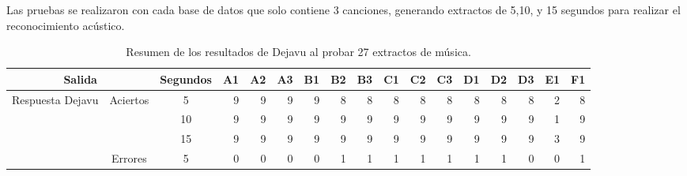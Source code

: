 \begin{sidewaystable}
\centering
\caption{Resumen de los resultados de Dejavu al probar 27 extractos de música.}{Las pruebas se realizaron con cada base de datos que solo contiene 3 canciones, generando extractos de 5,10, y 15 segundos para realizar el reconocimiento acústico.}
\label{tab:Resumen3Canciones}
\begin{tabular}{@{}ccc|rrrrrrrrrrrrrr@{}}
\toprule
\midrule
\multicolumn{2}{c}{Salida}                                            &  Segundos  & \multicolumn{1}{c}{A1} & \multicolumn{1}{c}{A2} & \multicolumn{1}{c}{A3} & \multicolumn{1}{c}{B1} & \multicolumn{1}{c}{B2} & \multicolumn{1}{c}{B3} & \multicolumn{1}{c}{C1} & \multicolumn{1}{c}{C2} & \multicolumn{1}{c}{C3} & \multicolumn{1}{c}{D1} & \multicolumn{1}{c}{D2} & \multicolumn{1}{c}{D3} & \multicolumn{1}{c}{E1} & \multicolumn{1}{c}{F1} \\ \midrule
\multirow{6}{*}{Respuesta Dejavu}    & \multirow{3}{*}{Aciertos}   & 5  & 9                      & 9                      & 9                      & 9                      & 8                      & 8                      & 8                      & 8                      & 8                      & 8                      & 8                      & 8                      & 2                      & 8                      \\
                                     &                             & 10 & 9                      & 9                      & 9                      & 9                      & 9                      & 9                      & 9                      & 9                      & 9                      & 9                      & 9                      & 9                      & 1                      & 9                      \\
                                     &                             & 15 & 9                      & 9                      & 9                      & 9                      & 9                      & 9                      & 9                      & 9                      & 9                      & 9                      & 9                      & 9                      & 3                      & 9                      \\ \cmidrule{2-17}
                                     & \multirow{3}{*}{Errores}    & 5  & 0                      & 0                      & 0                      & 0                      & 1                      & 1                      & 1                      & 1                      & 1                      & 1                      & 1                      & 0                      & 0                      & 1                      \\ 

\end{tabular}
\end{sidewaystable}
